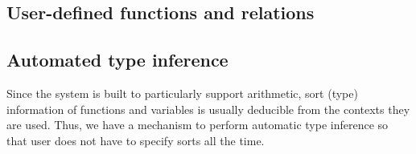 \documentclass[12pt]{article}
\begin{document}
\subsection{User-defined functions and relations}

\subsection{Automated type inference}


Since the system is built to particularly support arithmetic, sort (type) information of functions and variables is usually deducible from the contexts they are used. Thus, we have a mechanism to perform automatic type inference so that user does not have to specify sorts all the time.

\end{document}
